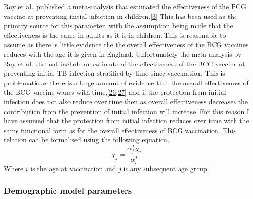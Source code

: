 \documentclass[11pt,twoside]{bristolthesis}
\begin{document}
  Roy et al.~published a meta-analysis that estimated the effectiveness of the BCG vaccine at preventing initial infection in children.{[}\protect\hyperlink{ref-Roy2014}{3}{]} This has been used as the primary source for this parameter, with the assumption being made that the effectiveness is the same in adults as it is in children. This is reasonable to assume as there is little evidence the the overall effectiveness of the BCG vaccines reduces with the age it is given in England. Unfortunately the meta-analysis by Roy et al.~did not include an estimate of the effectiveness of the BCG vaccine at preventing initial TB infection stratified by time since vaccination. This is problematic as there is a large amount of evidence that the overall effectiveness of the BCG vaccine wanes with time,{[}\protect\hyperlink{ref-Abubakar2013}{26},\protect\hyperlink{ref-Mangtani2017}{27}{]} and if the protection from initial infection does not also reduce over time then as overall effectiveness decreases the contribution from the prevention of initial infection will increase. For this reason I have assumed that the protection from initial infection reduces over time with the same functional form as for the overall effectiveness of BCG vaccination. This relation can be formalised using the following equation,
  \begin{equation}
    \chi_j = \frac{\alpha^T_j\chi_i}{\alpha^T_i}
    \label{eq:fun-prev-initial-inf}
  \end{equation}
  Where \(i\) is the age at vaccination and \(j\) is any subsequent age group.
  
  \hypertarget{demo-model-parameters}{%
  \subsubsection{Demographic model parameters}\label{demo-model-parameters}}
  
\end{document}
